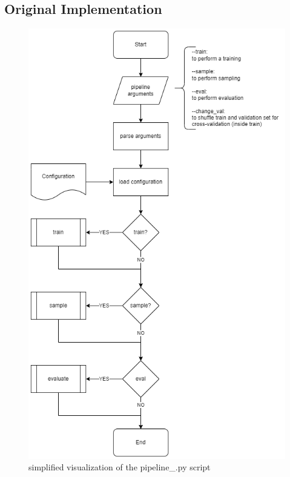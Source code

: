 \subsection[]{Original Implementation}
\begin{figure}[!b]
	\centering
	\includegraphics[width=\textwidth, height=0.7\textheight, keepaspectratio]{images/pipeline-ORIGINAL.png}
	\caption{simplified visualization of the pipeline\_\*.py script}
\end{figure}
